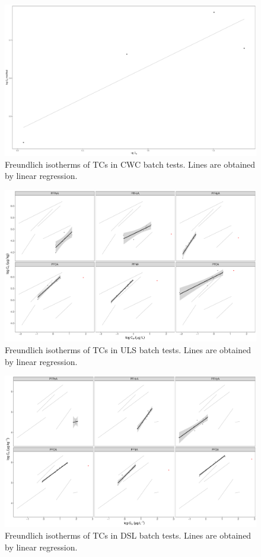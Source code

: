 \begin{figure}
    \centering
    \includegraphics[width=\textwidth]{R/figs/CWC_facet_isotherm.pdf}
    \caption{Freundlich isotherms of TCs in CWC batch tests. Lines are obtained by linear regression.}
    \label{fig:CWC_isotherm2}
\end{figure}

\begin{figure}
    \centering
    \includegraphics[width=\textwidth]{R/figs/ULS_facet_isotherm.pdf}
    \caption{Freundlich isotherms of TCs in ULS batch tests. Lines are obtained by linear regression.}
    \label{fig:ULS_isotherm2}
\end{figure}

\begin{figure}
    \centering
    \includegraphics[width=\textwidth]{R/figs/DSL_facet_isotherm.pdf}
    \caption{Freundlich isotherms of TCs in DSL batch tests. Lines are obtained by linear regression.}
    \label{fig:DSL_isotherm2}
\end{figure}

